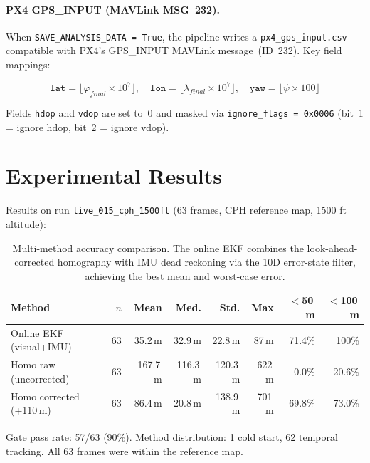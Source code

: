 \documentclass[12pt,a4paper]{article}
\begin{document}
\paragraph{PX4 GPS\_INPUT (MAVLink MSG~232).}
When \texttt{SAVE\_ANALYSIS\_DATA = True}, the pipeline writes a
\texttt{px4\_gps\_input.csv} compatible with PX4's GPS\_INPUT MAVLink
message~(ID~232). Key field mappings:

\begin{equation*}
    \texttt{lat} = \lfloor\varphi_{final} \times 10^7\rfloor,\quad
    \texttt{lon} = \lfloor\lambda_{final} \times 10^7\rfloor,\quad
    \texttt{yaw} = \lfloor\psi \times 100\rfloor
\end{equation*}

Fields \texttt{hdop} and \texttt{vdop} are set to~0 and masked via
\texttt{ignore\_flags = 0x0006} (bit~1 = ignore hdop, bit~2 = ignore vdop).

\section{Experimental Results}

Results on run \texttt{live\_015\_cph\_1500ft} (63 frames, CPH reference map,
1500 ft altitude):

\begin{table}[H]
\centering
\begin{tabular}{@{}lrrrrrrr@{}}
\toprule
\textbf{Method} & $n$ & \textbf{Mean} & \textbf{Med.} & \textbf{Std.} & \textbf{Max}
    & $<$50\,m & $<$100\,m \\
\midrule
Online EKF (visual+IMU) & 63 & 35.2\,m & 32.9\,m & 22.8\,m & 87\,m & 71.4\% & 100\% \\
Homo raw (uncorrected) & 63 & 167.7\,m & 116.3\,m & 120.3\,m & 622\,m & 0.0\% & 20.6\% \\
Homo corrected (+110\,m) & 63 & 86.4\,m & 20.8\,m & 138.9\,m & 701\,m & 69.8\% & 73.0\% \\
\bottomrule
\end{tabular}
\caption{Multi-method accuracy comparison. The online EKF combines the
look-ahead-corrected homography with IMU dead reckoning via the 10D
error-state filter, achieving the best mean and worst-case error.}
\end{table}

Gate pass rate: 57/63 (90\%). Method distribution: 1 cold start, 62 temporal
tracking. All 63 frames were within the reference map.
\end{document}
